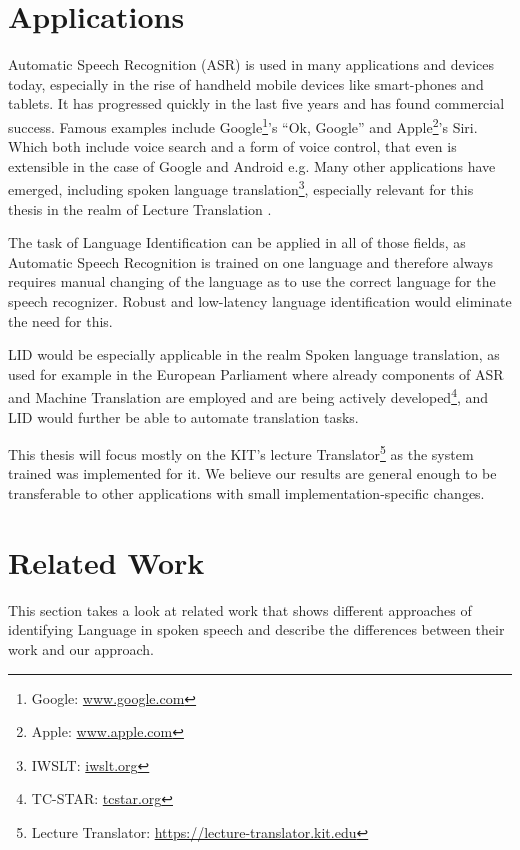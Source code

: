 \section{Applications}
\label{sec:Introduction:Apps}
Automatic Speech Recognition (ASR) is used in many applications and devices today, especially in the rise of handheld mobile devices like smart-phones and tablets. It has progressed quickly in the last five years and has found commercial success. Famous examples include Google\footnote{Google: \url{www.google.com}}'s ``Ok, Google'' and Apple\footnote{Apple: \url{www.apple.com}}'s Siri. Which both include voice search\cite{franz2008voice} and a form of voice control, that even is extensible in the case of Google and Android e.g\cite{voicecontrol2014}. Many other applications have emerged, including spoken language translation\footnote{IWSLT: \url{iwslt.org}}, especially relevant for this thesis in the realm of Lecture Translation\cite{lecturetranslator2016} .

The task of Language Identification can be applied in all of those fields, as Automatic Speech Recognition is trained on one language and therefore always requires manual changing of the language as to use the correct language for the speech recognizer. Robust and low-latency language identification would eliminate the need for this.

LID would be especially applicable in the realm Spoken language translation, as used for example in the European Parliament where already components of ASR and Machine Translation are employed and are being actively developed\footnote{TC-STAR: \url{tcstar.org}}\cite{vilar2005statistical}, and LID would further be able to automate translation tasks.

This thesis will focus mostly on the KIT's lecture Translator\footnote{Lecture Translator: \url{https://lecture-translator.kit.edu}}  as the system trained was implemented for it. We believe our results are general enough to be transferable to other applications with small implementation-specific changes.

\section{Related Work}
\label{ch:Intro:Related}
This section takes a look at related work that shows different approaches of identifying Language in spoken speech and describe the differences between their work and our approach. 